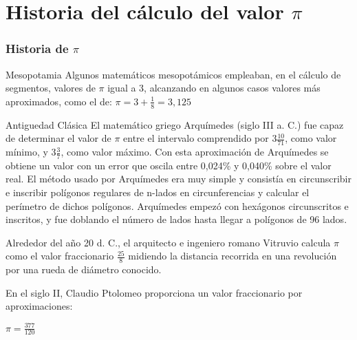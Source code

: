 \documentclass{beamer}
\begin{document}
\section {Historia del cálculo del valor $\pi$}
\begin{frame}
  \frametitle{Historia de $\pi$}
  \begin {block}{Mesopotamia}
  Algunos matemáticos mesopotámicos empleaban, en el cálculo de segmentos, valores de $\pi$ igual a 3, alcanzando en algunos casos valores más aproximados, como el de:
  $\pi = 3+\frac{1}{8} = 3,125$
\end {block}

  \begin {block}{Antiguedad Clásica}
  El matemático griego Arquímedes (siglo III a. C.) fue capaz de determinar el valor de $\pi$ entre el intervalo comprendido por $3 \frac{10}{71}$, como valor mínimo, y $3 \frac{3}{7}$, como valor máximo. Con esta aproximación de Arquímedes se obtiene un valor con un error que oscila entre 0,024\% y 0,040\% sobre el valor real. El método usado por Arquímedes era muy simple y consistía en circunscribir e inscribir polígonos regulares de n-lados en circunferencias y calcular el perímetro de dichos polígonos. Arquímedes empezó con hexágonos circunscritos e inscritos, y fue doblando el número de lados hasta llegar a polígonos de 96 lados.

Alrededor del año 20 d. C., el arquitecto e ingeniero romano Vitruvio calcula $\pi$ como el valor fraccionario  $\frac{25}{8}$ midiendo la distancia recorrida en una revolución por una rueda de diámetro conocido.

En el siglo II, Claudio Ptolomeo proporciona un valor fraccionario por aproximaciones:
\begin{center} 
$\pi= \frac {377}{120}$
\end{center}
\end {block}
\end {frame}
\end{document}
